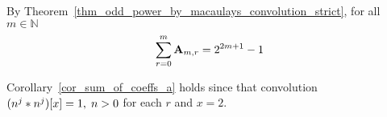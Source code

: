 \begin{cor}
    \label{cor_sum_of_coeffs_a}
    By Theorem~\ref{thm_odd_power_by_macaulays_convolution_strict}, for all $m\in\mathbb{N}$
    \begin{equation*}
        \sum_{r=0}^{m} {\mathbf{A}} \sb{m,r} = 2^{2m+1} - 1
    \end{equation*}
\end{cor}
Corollary~\ref{cor_sum_of_coeffs_a} holds since that convolution $(n \sp{j} \ast n \sp{j}) [x]=1, \; n > 0$
for each $r$ and $x=2$.
